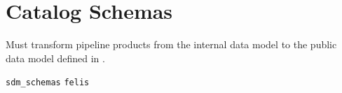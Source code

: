 \section{Catalog Schemas}
\label{sec:schemas}

Must transform pipeline products from the internal data model to the public data model defined in \citet{LSE-163}.

\texttt{sdm\_schemas}
\texttt{felis}
